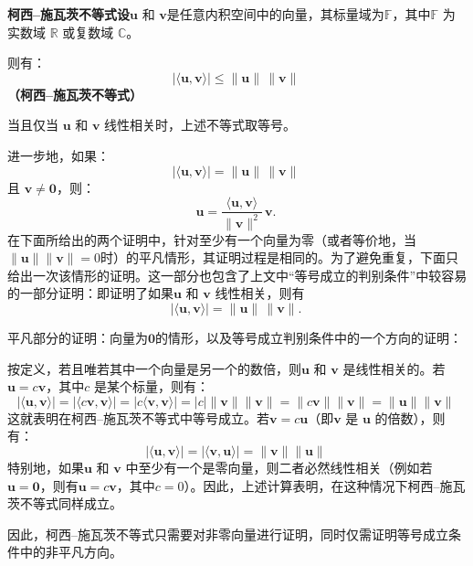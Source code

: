 \textbf{柯西–施瓦茨不等式设}$\mathbf{u}$ 和 $\mathbf{v}$是任意内积空间中的向量，其标量域为$\mathbb{F}$，其中$\mathbb{F}$ 为实数域 $\mathbb{R}$ 或复数域 $\mathbb{C}$。

则有：
$$
\left| \langle \mathbf{u}, \mathbf{v} \rangle \right| \leq \|\mathbf{u}\| \, \|\mathbf{v}\|~
$$
\textbf{（柯西–施瓦茨不等式）}

当且仅当 $\mathbf{u}$ 和 $\mathbf{v}$ 线性相关时，上述不等式取等号。

进一步地，如果：
$$
\left| \langle \mathbf{u}, \mathbf{v} \rangle \right| = \|\mathbf{u}\| \, \|\mathbf{v}\|~
$$
且 $\mathbf{v} \neq \mathbf{0}$，则：
$$
\mathbf{u} = \frac{ \langle \mathbf{u}, \mathbf{v} \rangle }{ \|\mathbf{v}\|^2 } \, \mathbf{v}.~
$$
在下面所给出的两个证明中，针对至少有一个向量为零（或者等价地，当$\|\mathbf{u}\|\|\mathbf{v}\| = 0$时）的平凡情形，其证明过程是相同的。为了避免重复，下面只给出一次该情形的证明。这一部分也包含了上文中“等号成立的判别条件”中较容易的一部分证明：即证明了如果$\mathbf{u}$ 和 $\mathbf{v}$ 线性相关，则有
$$
\left| \langle \mathbf{u}, \mathbf{v} \rangle \right| = \|\mathbf{u}\| \, \|\mathbf{v}\|.~
$$

平凡部分的证明：向量为$\mathbf{0}$的情形，以及等号成立判别条件中的一个方向的证明：

按定义，若且唯若其中一个向量是另一个的数倍，则$\mathbf{u}$ 和 $\mathbf{v}$ 是线性相关的。若$\mathbf{u} = c\mathbf{v}$，其中$c$ 是某个标量，则有：
$$
|\langle \mathbf{u}, \mathbf{v} \rangle| = |\langle c\mathbf{v}, \mathbf{v} \rangle| = |c\langle \mathbf{v}, \mathbf{v} \rangle| = |c| \|\mathbf{v}\|\|\mathbf{v}\| = \|c\mathbf{v}\|\|\mathbf{v}\| = \|\mathbf{u}\|\|\mathbf{v}\|~
$$
这就表明在柯西–施瓦茨不等式中等号成立。若$\mathbf{v} = c\mathbf{u}$（即$\mathbf{v}$ 是 $\mathbf{u}$ 的倍数），则有：
$$
|\langle \mathbf{u}, \mathbf{v} \rangle| = |\langle \mathbf{v}, \mathbf{u} \rangle| = \|\mathbf{v}\|\|\mathbf{u}\|~
$$
特别地，如果$\mathbf{u}$ 和 $\mathbf{v}$ 中至少有一个是零向量，则二者必然线性相关（例如若
$\mathbf{u} = \mathbf{0}$，则有$\mathbf{u} = c\mathbf{v}$，其中$c = 0$）。因此，上述计算表明，在这种情况下柯西–施瓦茨不等式同样成立。

因此，柯西–施瓦茨不等式只需要对非零向量进行证明，同时仅需证明等号成立条件中的非平凡方向。
